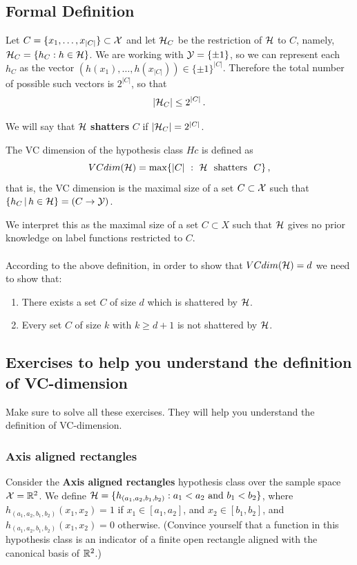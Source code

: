 \subsection{Formal Definition}

Let $C = \{x_1,\ldots,x_{|C|}\} \subset \mathcal{X}$ and let $\mathcal{H}_C$ be the restriction of $\mathcal{H}$ to $C$, namely,
 $\mathcal{H}_C = \{ h_C : h \in \mathcal{H}\}$.
We are working with $\mathcal{Y}=\{\pm 1\}$, so we can represent each $h_C$ as the vector $(h(x_1),\ldots,h(x_{|C|})) \in \{\pm 1\}^{|C|}$. Therefore the total number of possible such vectors is $2^{|C|}$, so that
$$|\mathcal{H}_C| \le 2^{|C|}\,.$$

We will say that $\mathcal{H}$ \textbf{shatters} $C$ if $|\mathcal{H}_C| =  2^{|C|}$.  
\begin{definition}
The VC dimension of the hypothesis class $Hc$ is defined as 
$$VCdim(\mathcal{H}) = \max\{ |C| ~:~ \mathcal{H}~\,\,\textrm{shatters}~\,\,C \}\,,$$
that is, the VC dimension is the maximal size of a set $C\subset \mathcal{X}$ such that $\{h_C\,|\,h\in\mathcal{H}\} = (C\to\mathcal{Y})$.
\end{definition}
We interpret this as the maximal size of a set $C\subset X$ such that 
$\mathcal{H}$ gives no prior knowledge on label functions restricted to $C$.
%
\\~\\
According to the above definition, in order to show that $VCdim(\mathcal{H}) = d$ we need to show that:
\begin{enumerate}
\item There exists a set $C$ of size $d$ which is shattered by $\mathcal{H}$.
\item Every set $C$ of size $k$ with $k\geq d+1$ is not shattered by $\mathcal{H}$.
\end{enumerate}

\subsection{Exercises to help you understand the definition of VC-dimension}

Make sure to solve all these exercises. They will help you understand the
definition of VC-dimension.

\subsubsection{Axis aligned rectangles}
Consider the \textbf{Axis aligned rectangles} hypothesis class over the sample space 
$\mathcal{X} = \mathbb{R}^2$. We define $\mathcal{H} = \{h_{(a_1,  a_2, b_1 , b_2)}: a_1 < a_2 ~\text{and}~  b_1 < b_2 \}$, 
where $ h_{(a_1, a_2, b_1 , b_2)}(x_1,x_2) = 1$ if $x_1 \in [a_1,a_2]$, and $x_2 \in [b_1,b_2]$, and  $ h_{(a_1, a_2, b_1 , b_2)}(x_1,x_2) = 0$ otherwise. (Convince yourself that a function in this hypothesis class is an indicator of a finite open rectangle aligned with the canonical basis of $\mathbb{R}^2$.)

